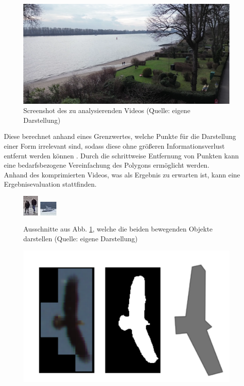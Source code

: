 \documentclass[a4paper,11pt,pdftex, parskip]{scrreprt}
\begin{document}
{  
\begin{figure}[ht]
    \centering
    \includegraphics[scale=0.2, keepaspectratio]{images/screenshot_video_moratz.png}
    \caption[Screenshot des zu analysierenden Videos]{Screenshot des zu analysierenden Videos (Quelle: eigene Darstellung)}
    \label{Scr_ges_Vid}
\end{figure}
Diese berechnet anhand eines Grenzwertes, welche Punkte für die Darstellung einer Form irrelevant sind, sodass diese ohne größeren Informationsverlust entfernt werden können \citep{Barkowsky2000}. Durch die schrittweise Entfernung von Punkten kann eine bedarfsbezogene Vereinfachung des Polygons ermöglicht werden. \\
Anhand des komprimierten Videos, was als Ergebnis zu erwarten ist, kann eine Ergebnisevaluation stattfinden.
\begin{figure}[ht]
    \centering
    \includegraphics[scale = 4, keepaspectratio] {images/detail_screenshot_people.png}
    \includegraphics[scale = 4, keepaspectratio]{images/detail_screenshot_boat.png}
    \caption[Ausschnitte aus Abb. \ref{Scr_ges_Vid}, welche die beiden bewegenden Objekte darstellen ]{Ausschnitte aus Abb. \ref{Scr_ges_Vid}, welche die beiden bewegenden Objekte darstellen (Quelle: eigene Darstellung)}
    \label{Scr_detail_Obj}
\end{figure}
\begin{figure}[ht]
    \centering
    \includegraphics*[scale = 0.5, keepaspectratio]{images/Example_bird.png}

\end{figure}}
\end{document}
